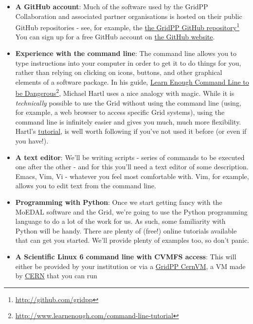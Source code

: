 \begin{itemize}
\tightlist
\item
  \textbf{A GitHub account}: Much of
  the software used by the GridPP Collaboration
  and associated partner organisations is hosted on their
  public GitHub repositories - see, for example, the
  \href{http://github.com/gridpp}{the GridPP GitHub repository}\footnote{
\href{http://github.com/gridpp}{http://github.com/gridpp}
} You can sign up for a free GitHub account on \href{http://github.com}{the
  GitHub website}.
\item
  \textbf{Experience with the command line}: The command line allows you
  to type instructions into your computer in order to get it to do
  things for you, rather than relying on clicking on icons, buttons, and
  other graphical elements of a software package. In his guide,
  \href{http://www.learnenough.com/command-line-tutorial}{Learn Enough
  Command Line to be Dangerous}\footnote{
\href{http://www.learnenough.com/command-line-tutorial}{http://www.learnenough.com/command-line-tutorial}
}, Michael Hartl uses a nice analogy with
  magic. While it is \emph{technically} possible to use the Grid without
  using the command line (using, for example, a web browser to access
  specific Grid systems), using the command line is infinitely easier
  and gives you much, much more flexibility. Hartl's
  \href{http://www.learnenough.com/command-line-tutorial}{tutorial}, is
  well worth following if you've not used it before (or even if you
  have!).
\item
  \textbf{A text editor}: We'll be writing scripts - series of commands
  to be executed one after the other - and for this you'll need a text
  editor of some description. Emacs, Vim, Vi - whatever you feel most
  comfortable with. Vim, for example, allows you to edit text from the
  command line.
\item
  \textbf{Programming with Python}: Once we start getting fancy with the
  \ac{MoEDAL} software and the
  Grid, we're going to use the Python programming language
  to do a lot of the work for us. 
  As such, some familiarity with Python will be handy. There are plenty of
  (free!) online tutorials available that can get you started. We'll
  provide plenty of examples too, so don't panic.
\item
  \textbf{A Scientific Linux 6 command line with CVMFS access}: This
  will either be provided by your institution or
  via a \href{../gridpp-cernvm/gridpp-cernvm.html}{GridPP CernVM}, a
  \acf{VM} made by \href{http://cern.home}{CERN} that you can run

\end{itemize}
